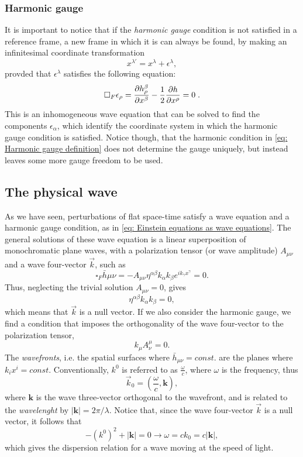 \subsubsection{Harmonic gauge}
It is important to notice that if the \textit{harmonic gauge} condition is not satisfied in a reference frame, a new frame in which it is can always be found, by making an infinitesimal coordinate transformation
\begin{equation}
    x^{\lambda'} = x^\lambda + \epsilon^\lambda,
    \label{eq: infinitesimal coordinate transformation}
\end{equation}
provded that $\epsilon^\lambda$ satisfies the following equation:
\[
    \square_F\epsilon_\rho = \frac{\partial h^\beta_\rho}{\partial x^\beta} - \frac{1}{2} \frac{\partial h}{\partial x^\rho} = 0\hspace{1mm}.
\]
This is an inhomogeneous wave equation that can be solved to find the components $\epsilon_\alpha$, which identify the coordinate system in which the harmonic gauge condition is satisfied.
Notice though, that the harmonic condition in \eqref{eq: Harmonic gauge definition} does not determine the gauge uniquely, but instead leaves some more gauge freedom to be used.

\subsection{The physical wave}
As we have seen, perturbations of flat space-time satisfy a wave equation and a harmonic gauge condition, as in \eqref{eq: Einstein equations as wave equations}.
The general solutions of these wave equation is a linear superposition of monochromatic plane waves, with a polarization tensor (or wave amplitude) $A_{\mu\nu}$ and a wave four-vector $\vec{k}$, such as
\[
    \square_F \bar{h}{\mu\nu} = -A_{\mu\nu}\eta^{\alpha\beta} k_\alpha k_\beta e^{ik_\gamma x^\gamma} = 0.
\]
Thus, neglecting the trivial solution $A_{\mu\nu} = 0$, gives 
\[
    \eta^{\alpha\beta} k_\alpha k_\beta = 0,
\]
which means that $\vec{k}$ is a null vector.
If we also consider the harmonic gauge, we find a condition that imposes the orthogonality  of the wave four-vector to the polarization tensor,
\[
    k_\mu A^\mu_\nu = 0.
\]
The \textit{wavefronts}, i.e. the spatial surfaces where $\bar{h}_{\mu\nu}= const.$ are the planes where $k_ix^i=const.$
Conventionally, $k^0$ is referred to as $\frac{\omega}{c}$, where $\omega$ is the frequency, thus
\[
    \vec{k}_0 = \left(\frac{\omega}{c},\mathbf{k}\right),
\]
where $\mathbf{k}$ is the wave three-vector orthogonal to the wavefront, and is related to the \textit{wavelenght} by $|\mathbf{k}| = 2\pi/\lambda$.
Notice that, since the wave four-vector $\vec{k}$ is a null vector, it follows that
\[
    -(k^0)^2 + |\mathbf{k}| = 0 \to \omega = ck_0 = c|\mathbf{k}|,
\]
which gives the dispersion relation for a wave moving at the speed of light.


